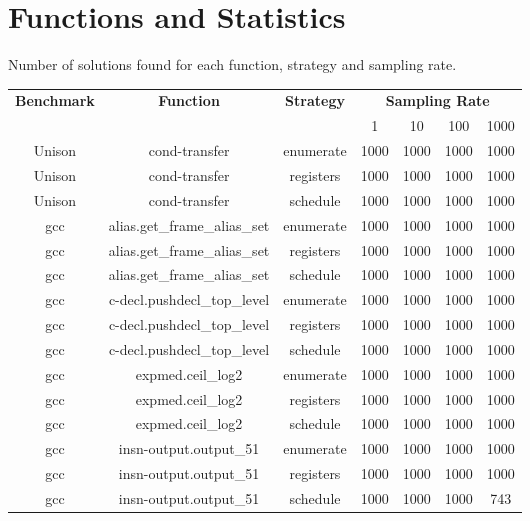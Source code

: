 
\section{Functions and Statistics}

Number of solutions found for each function, strategy and sampling rate.

\begin{center}
	\begingroup
	\setlength{\LTleft}{-20cm plus -1fill}
	\setlength{\LTright}{\LTleft}
	\begin{longtable}{c|c|c|c|c|c|c}
		\multirow{2}{*}{\textbf{Benchmark}} & \multirow{2}{*}{\textbf{Function}} & \multirow{2}{*}{\textbf{Strategy}} & \multicolumn{4}{c}{\textbf{Sampling Rate}} \\
		\cline{4-7}
		& & & 1 & 10 & 100 & 1000 \\ \hline
		\endhead
		Unison & cond-transfer & enumerate & 1000 & 1000 & 1000 & 1000 \\
		Unison & cond-transfer & registers & 1000 & 1000 & 1000 & 1000 \\
		Unison & cond-transfer & schedule & 1000 & 1000 & 1000 & 1000 \\
		\hline
		gcc & alias.get\_frame\_alias\_set & enumerate & 1000 & 1000 & 1000 & 1000 \\
		gcc & alias.get\_frame\_alias\_set & registers & 1000 & 1000 & 1000 & 1000 \\
		gcc & alias.get\_frame\_alias\_set & schedule & 1000 & 1000 & 1000 & 1000 \\
		\hline
		gcc & c-decl.pushdecl\_top\_level & enumerate & 1000 & 1000 & 1000 & 1000 \\
		gcc & c-decl.pushdecl\_top\_level & registers & 1000 & 1000 & 1000 & 1000 \\
		gcc & c-decl.pushdecl\_top\_level & schedule & 1000 & 1000 & 1000 & 1000 \\
		\hline
		gcc & expmed.ceil\_log2 & enumerate & 1000 & 1000 & 1000 & 1000 \\
		gcc & expmed.ceil\_log2 & registers & 1000 & 1000 & 1000 & 1000 \\
		gcc & expmed.ceil\_log2 & schedule & 1000 & 1000 & 1000 & 1000 \\
		\hline
		gcc & insn-output.output\_51 & enumerate & 1000 & 1000 & 1000 & 1000 \\
		gcc & insn-output.output\_51 & registers & 1000 & 1000 & 1000 & 1000 \\
		gcc & insn-output.output\_51 & schedule & 1000 & 1000 & 1000 & 743 \\

\end{longtable}
\end{center}
